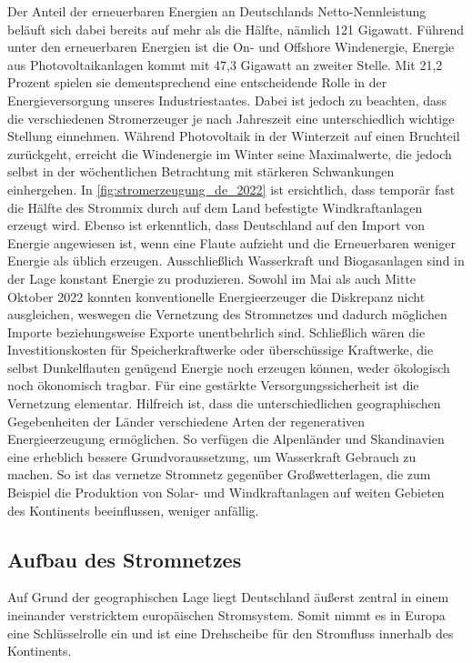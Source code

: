 \documentclass[12pt, a4paper]{article}
\begin{document}
Der Anteil der erneuerbaren Energien an Deutschlands Netto-Nennleistung beläuft sich dabei bereits auf mehr als die Hälfte, nämlich 121 Gigawatt. Führend unter den erneuerbaren Energien ist die On- und Offshore Windenergie, Energie aus Photovoltaikanlagen kommt mit 47,3 Gigawatt an zweiter Stelle. Mit 21,2 Prozent spielen sie dementsprechend eine entscheidende Rolle in der Energieversorgung unseres Industriestaates. Dabei ist jedoch zu beachten, dass die verschiedenen Stromerzeuger je nach Jahreszeit eine unterschiedlich wichtige Stellung einnehmen. Während Photovoltaik in der Winterzeit auf einen Bruchteil zurückgeht, erreicht die Windenergie im Winter seine Maximalwerte, die jedoch selbst in der wöchentlichen Betrachtung mit stärkeren Schwankungen einhergehen. In \autoref{fig:stromerzeugung_de_2022} ist ersichtlich, dass temporär fast die Hälfte des Strommix durch auf dem Land befestigte Windkraftanlagen erzeugt wird. Ebenso ist erkenntlich, dass Deutschland auf den Import von Energie angewiesen ist, wenn eine Flaute aufzieht und die Erneuerbaren weniger Energie als üblich erzeugen. Ausschließlich Wasserkraft und Biogasanlagen sind in der Lage konstant Energie zu produzieren. Sowohl im Mai als auch Mitte Oktober 2022 konnten konventionelle Energieerzeuger die Diskrepanz nicht ausgleichen, weswegen die Vernetzung des Stromnetzes und dadurch möglichen Importe beziehungsweise Exporte unentbehrlich sind. Schließlich wären die Investitionskosten für Speicherkraftwerke oder überschüssige Kraftwerke, die selbst Dunkelflauten genügend Energie noch erzeugen können, weder ökologisch noch ökonomisch tragbar. Für eine gestärkte Versorgungssicherheit ist die Vernetzung elementar. Hilfreich ist, dass die unterschiedlichen geographischen Gegebenheiten der Länder verschiedene Arten der regenerativen Energieerzeugung ermöglichen. So verfügen die Alpenländer und Skandinavien eine erheblich bessere Grundvoraussetzung, um Wasserkraft Gebrauch zu machen. So ist das vernetze Stromnetz gegenüber Großwetterlagen, die zum Beispiel die Produktion von Solar- und Windkraftanlagen auf weiten Gebieten des Kontinents beeinflussen, weniger anfällig.


\subsection{Aufbau des Stromnetzes}

Auf Grund der geographischen Lage liegt Deutschland äußerst zentral in einem ineinander verstricktem europäischen Stromsystem. Somit nimmt es in Europa eine Schlüsselrolle ein und ist eine Drehscheibe für den Stromfluss innerhalb des Kontinents.
\end{document}
